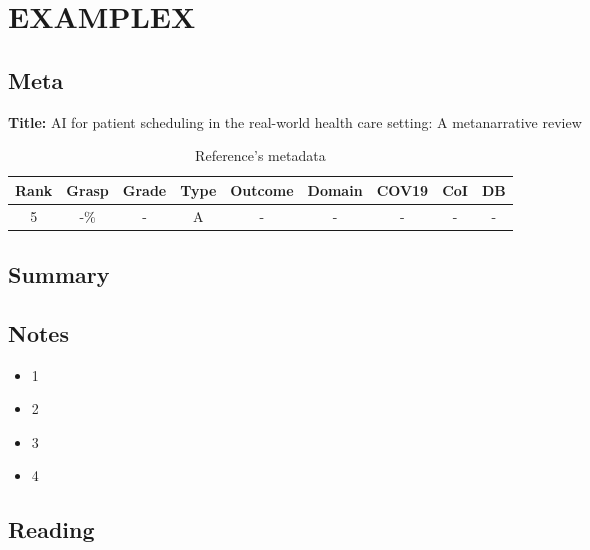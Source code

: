 \section{ EXAMPLEX }


\subsection{Meta}

    \textbf{Title:}
    AI for patient scheduling in the real-world health care setting: A metanarrative review

    \begin{table}[H]
        \centering
        \begin{tabular}{|c|c|c|c|c|c|c|c|c|}
            \hline
                \textbf{Rank} & \textbf{Grasp} & \textbf{Grade} & \textbf{Type} & \textbf{Outcome} & \textbf{Domain} & \textbf{COV19} & \textbf{CoI} & \textbf{DB} \\
            \hline
                5 & -\% & - & A & - & - & - & - & - \\
            \hline
        \end{tabular}
        \caption{Reference's metadata}
        \label{tab:EXAMPLEX}
    \end{table}

\subsection{Summary}
    

\subsection{Notes}
    \begin{itemize}
        \item 1
        \item 2
        \item 3
        \item 4
    \end{itemize}


\subsection{Reading}